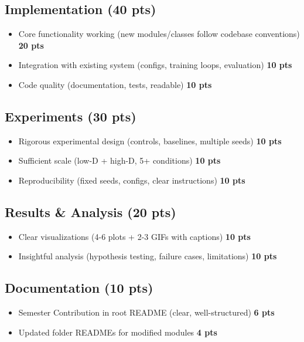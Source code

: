 \documentclass[11pt,a4paper]{scrartcl}
\begin{document}
\vspace{0.5em}

\subsection*{Implementation (40 pts)}
\begin{itemize}
    \item Core functionality working (new modules/classes follow codebase conventions) \dotfill \textbf{20 pts}
    \item Integration with existing system (configs, training loops, evaluation) \dotfill \textbf{10 pts}
    \item Code quality (documentation, tests, readable) \dotfill \textbf{10 pts}
\end{itemize}

\subsection*{Experiments (30 pts)}
\begin{itemize}
    \item Rigorous experimental design (controls, baselines, multiple seeds) \dotfill \textbf{10 pts}
    \item Sufficient scale (low-D + high-D, 5+ conditions) \dotfill \textbf{10 pts}
    \item Reproducibility (fixed seeds, configs, clear instructions) \dotfill \textbf{10 pts}
\end{itemize}

\subsection*{Results \& Analysis (20 pts)}
\begin{itemize}
    \item Clear visualizations (4-6 plots + 2-3 GIFs with captions) \dotfill \textbf{10 pts}
    \item Insightful analysis (hypothesis testing, failure cases, limitations) \dotfill \textbf{10 pts}
\end{itemize}

\subsection*{Documentation (10 pts)}
\begin{itemize}
    \item Semester Contribution in root README (clear, well-structured) \dotfill \textbf{6 pts}
    \item Updated folder READMEs for modified modules \dotfill \textbf{4 pts}
\end{itemize}
\end{document}
